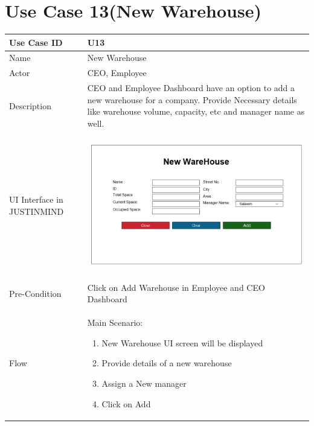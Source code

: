 \documentclass[12pt,a4paper]{report}
\begin{document}
\section{Use Case 13(New Warehouse) }

\begin{tabular}{ | m{3cm} | m{12cm}| } \hline

Use Case ID &  U13 \\\hline

Name  	    &  New Warehouse \\ \hline

Actor     	& CEO, Employee \\ \hline

Description &  CEO and Employee Dashboard have an option to add a new warehouse for a company. Provide Necessary details like warehouse volume, capacity, etc and manager name as well. \\ \hline

UI Interface in JUSTINMIND & \begin{center} \includegraphics[scale=0.3]{./UIs for Latex Reports/UI-014 AddWarehouse@1x.png}\end{center}  \\ \hline

Pre-Condition &   Click on Add Warehouse in Employee and CEO Dashboard\\ \hline


Flow & Main Scenario:

\begin{enumerate}
\item   New Warehouse UI screen will be displayed
\item  Provide details of a new warehouse
\item  Assign a New manager
\item  Click on Add



\end{enumerate}
\end{tabular}
\end{document}
